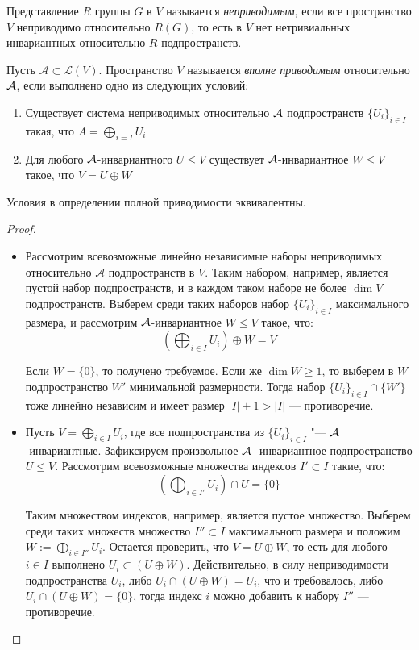 \begin{definition}
	Представление $R$ группы $G$ в $V$ называется \textit{неприводимым}, если все пространство $V$ неприводимо относительно $R(G)$, то есть в $V$ нет нетривиальных инвариантных относительно $R$ подпространств.
\end{definition}

\begin{definition}
	Пусть $\mathcal A \subset \mathcal{L}(V)$. Пространство $V$ называется \textit{вполне приводимым} относительно $\mathcal A$, если выполнено одно из следующих условий:
	\begin{enumerate}
		\item Существует система неприводимых относительно $\mathcal A$ подпространств $\{U_i\}_{i \in I}$ такая, что $A = \bigoplus_{i = I}U_i$
		\item Для любого $\mathcal A$-инвариантного $U \le V$ существует $\mathcal A$-инвариантное $W \le V$ такое, что $V = U \oplus W$
	\end{enumerate}
\end{definition}

\begin{theorem}
	Условия в определении полной приводимости эквивалентны.
\end{theorem}

\begin{proof}~
	\begin{itemize}
		\item{}Рассмотрим всевозможные линейно независимые наборы неприводимых относительно $\mathcal A$ подпространств в $V$. Таким набором, например, является пустой набор подпространств, и в каждом таком наборе не более $\dim{V}$ подпространств. Выберем среди таких наборов набор $\{U_i\}_{i \in I}$ максимального размера, и рассмотрим $\mathcal A$-инвариантное $W \le V$ такое, что:
		\[\left(\bigoplus_{i \in I}U_i\right) \oplus W = V\]
		
		Если $W = \{0\}$, то получено требуемое. Если же $\dim W \ge 1$, то выберем в $W$ подпространство $W'$ минимальной размерности. Тогда набор $\{U_i\}_{i \in I} \cap \{W'\}$ тоже линейно независим и имеет размер $|I| + 1  > |I|$ --- противоречие.
		
		\item{}Пусть $V = \bigoplus_{i \in I}U_i$, где все подпространства из $\{U_i\}_{i \in I}$ "--- $\mathcal A$-инвариантные. Зафиксируем произвольное $\mathcal A$- инвариантное подпространство $U \le V$. Рассмотрим всевозможные множества индексов $I' \subset I$ такие, что:
		\[\left(\bigoplus_{i \in I'}U_i\right) \cap U = \{0\}\]
		
		Таким множеством индексов, например, является пустое множество. Выберем среди таких множеств множество $I'' \subset I$ максимального размера и положим $W := \bigoplus_{i \in I''}U_i$. Остается проверить, что $V = U \oplus W$, то есть для любого $i \in I$ выполнено $U_i \subset (U \oplus W)$. Действительно, в силу неприводимости подпространства $U_i$, либо $U_i \cap (U \oplus W) = U_i$, что и требовалось, либо $U_i \cap (U \oplus W) = \{0\}$, тогда индекс $i$ можно добавить к набору $I''$ --- противоречие.\qedhere
	\end{itemize}
\end{proof}

